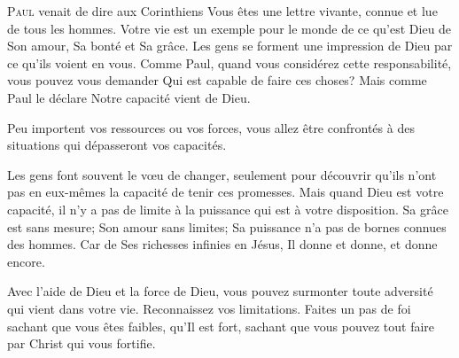 



\lettrine{P}{aul} venait de dire aux Corinthiens\frcolon {}
 \Og Vous êtes une lettre vivante, connue et lue de tous les hommes. \Fg{}
 Votre vie est un exemple pour le monde de ce qu'est Dieu \ocadr de Son amour,
 Sa bonté et Sa grâce.
 Les gens se forment une impression de Dieu par ce qu'ils voient en vous.
 Comme Paul, quand vous considérez cette responsabilité, 
 vous pouvez vous demander\frcolon {}
 \Og Qui est capable de faire ces choses? \Fg{}
 Mais  comme Paul le déclare\frcolon {}
 \Og Notre capacité vient de Dieu. \Fg{}

Peu importent vos ressources ou vos forces,
 vous allez être confrontés à des situations qui dépasseront vos capacités.


Les gens font souvent le v\oe{}u de changer, seulement pour découvrir
 qu'ils n'ont pas en eux-mêmes la capacité de tenir ces promesses.
 Mais quand Dieu est votre capacité, il n'y a pas de limite à la puissance
 qui est à votre disposition.
 Sa grâce est sans mesure; Son amour sans limites;
 Sa puissance n'a pas de bornes connues des hommes.
 Car de Ses richesses infinies en Jésus, Il donne et donne, et donne encore.

Avec l'aide de Dieu et la force de Dieu, vous pouvez surmonter
 toute adversité qui vient dans votre vie. Reconnaissez vos limitations.
 Faites un pas de foi sachant que vous êtes faibles, qu'Il est fort,
 sachant que vous pouvez tout faire par Christ qui vous fortifie.

\dvrule




